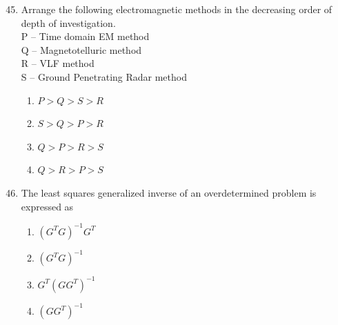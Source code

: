 \documentclass[journal,12pt,onecolumn]{IEEEtran}
\theoremstyle{remark}
\begin{document}
\begin{enumerate}
\setcounter{enumi}{44}

\item Arrange the following electromagnetic methods in the decreasing order of depth of investigation.  \\
P -- Time domain EM method  \\
Q -- Magnetotelluric method  \\
R -- VLF method  \\
S -- Ground Penetrating Radar method  

\begin{multicols}{2}
\begin{enumerate}
  \item \(P > Q > S > R\)
  \item \(S > Q > P > R\)
  \item \(Q > P > R > S\)
  \item \(Q > R > P > S\)
\end{enumerate}
\end{multicols}


\item The least squares generalized inverse of an overdetermined problem is expressed as  
\begin{multicols}{2}
\begin{enumerate}
\item \((G^T G)^{-1} G^T\)  
\item \((G^T G)^{-1}\)  
\item \(G^T (G G^T)^{-1}\)  
\item \((G G^T)^{-1}\)  
\end{enumerate}
\end{multicols}
\end{enumerate}
\end{document}
